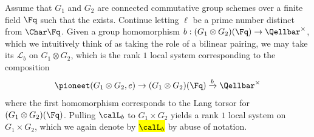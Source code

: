 \begin{definition} \label{definition:kummer_sheaf_of_a_character_on_the_tensor_product_of_commutative_group_schemes_over_a_finite_field}
    Assume that $G_1$ and $G_2$ are connected commutative group schemes over a finite field $\Fq$ such that the  exists. Continue letting $\ell$ be a prime number distinct from $\Char \Fq$. Given a group homomorphism $b: (G_1 \otimes G_2)(\Fq) \to \Qellbar^\times$, which we intuitively think of as taking the role of a bilinear pairing, we may take its $\mathcal{L}_b$ on $G_1 \otimes G_2$, which is the rank $1$ local system corresponding to the composition
    $$\pioneet(G_1 \otimes G_2, e) \to (G_1 \otimes G_2)(\Fq) \xrightarrow{b} \Qellbar^\times$$  
    where the first homomorphism corresponds to the Lang torsor for $(G_1 \otimes G_2)(\Fq)$. Pulling $\calL_b$ to $G_1 \times G_2$ yields a rank $1$ local system on $G_1 \times G_2$, which we again denote by \hl{$\calL_b$} by abuse of notation. 
\end{definition}